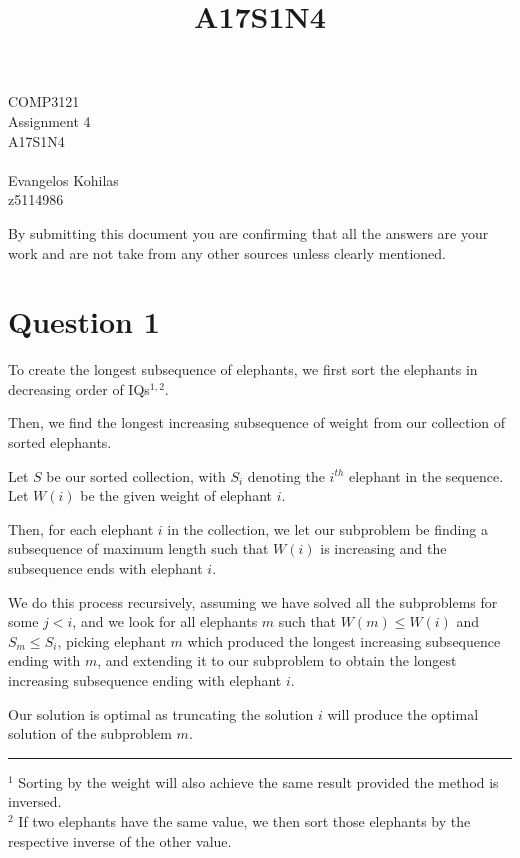\documentclass{article}
\title{A17S1N4}
\begin{document}
\begin{center}
    \begin{LARGE}
        COMP3121\\
        Assignment 4\\
        A17S1N4\\
        \hrulefill\\
        Evangelos Kohilas\\
        z5114986\\
        \hrulefill
    \end{LARGE}

    \begin{large}
        By submitting this document you are confirming that all the answers are your work and are not take from any other sources unless clearly mentioned.
    \end{large}

\end{center}

\section*{Question 1}
To create the longest subsequence of elephants, we first sort the elephants in decreasing order of IQs$^{1, 2}$.

Then, we find the longest increasing subsequence of weight from our collection of sorted elephants.

Let $S$ be our sorted collection, with $S_i$ denoting the $i^{th}$ elephant in the sequence.\\
Let $W(i)$ be the given weight of elephant $i$.

Then, for each elephant $i$ in the collection, we let our subproblem be finding a subsequence of maximum length such that $W(i)$ is increasing and the subsequence ends with elephant $i$.

We do this process recursively, assuming we have solved all the subproblems for some $j < i$, and we look for all elephants $m$ such that $W(m) \leq W(i)$ and $S_m \leq S_i$, picking elephant $m$ which produced the longest increasing subsequence ending with $m$, and extending it to our subproblem to obtain the longest increasing subsequence ending with elephant $i$.

Our solution is optimal as truncating the solution $i$ will produce the optimal solution of the subproblem $m$.\\

\hrule
$^1$ Sorting by the weight will also achieve the same result provided the method is inversed.\\
$^2$ If two elephants have the same value, we then sort those elephants by the respective inverse of the other value.
\end{document}
